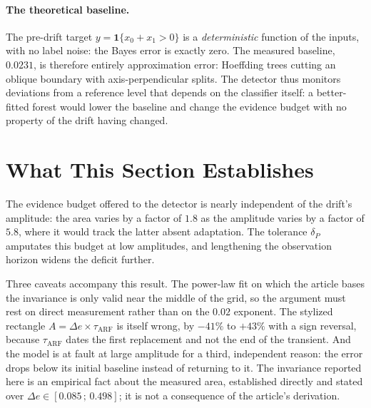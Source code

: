\documentclass[11pt,a4paper]{article}
\begin{document}
\paragraph{The theoretical baseline.} The pre-drift target
$y = \mathbf{1}\{x_0 + x_1 > 0\}$ is a \emph{deterministic} function of the inputs,
with no label noise: the Bayes error is exactly zero. The measured baseline,
$0.0231$, is therefore entirely approximation error: Hoeffding trees cutting an
oblique boundary with axis-perpendicular splits. The detector thus monitors deviations
from a reference level that depends on the classifier itself: a better-fitted forest
would lower the baseline and change the evidence budget with no property of the drift
having changed.
%

\section{What This Section Establishes}

The evidence budget offered to the detector is nearly independent of the drift's
amplitude: the area varies by a factor of $1.8$ as the amplitude varies by a factor
of $5.8$, where it would track the latter absent adaptation. The tolerance
$\delta_P$ amputates this budget at low amplitudes, and lengthening the observation
horizon widens the deficit further.

Three caveats accompany this result. The power-law fit on which the article bases the
invariance is only valid near the middle of the grid, so the argument must rest on direct
measurement rather than on the $0.02$ exponent. The stylized rectangle
$A = \Delta e \times \tau_{\mathrm{ARF}}$ is itself wrong, by $-41\%$ to $+43\%$ with a
sign reversal, because $\tau_{\mathrm{ARF}}$ dates the first replacement and not the end
of the transient. And the model is at fault at large amplitude for a third, independent
reason: the error drops below its initial baseline instead of returning to it. The
invariance reported here is an empirical fact about the measured area, established
directly and stated over $\Delta e \in [0.085\,;\,0.498]$; it is not a consequence of
the article's derivation.
%
\end{document}
